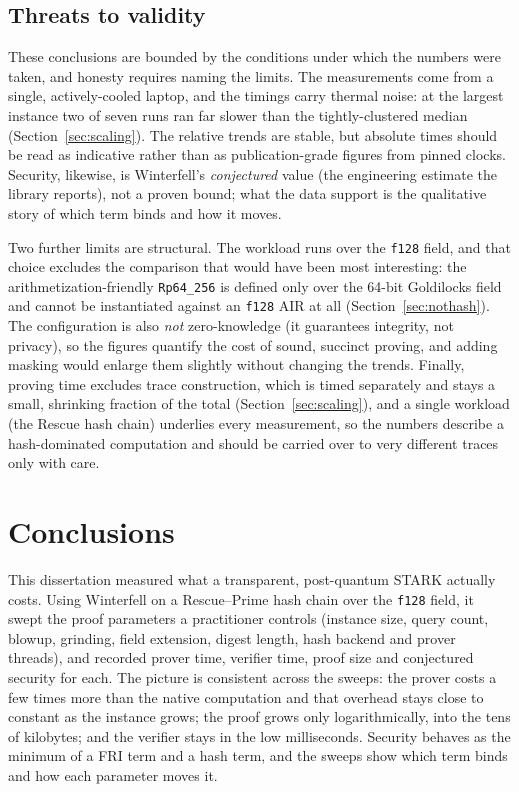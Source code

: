 \documentclass[11pt]{article}
\begin{document}
\subsection{Threats to validity}
\label{sec:disc-limits}

These conclusions are bounded by the conditions under which the numbers were taken, and honesty requires
naming the limits. The measurements come from a single, actively-cooled laptop, and the timings carry
thermal noise: at the largest instance two of seven runs ran far slower than the tightly-clustered
median (Section~\ref{sec:scaling}). The relative trends are stable, but absolute times should be read as
indicative rather than as publication-grade figures from pinned clocks. Security, likewise, is
Winterfell's \emph{conjectured} value (the engineering estimate the library reports), not a proven
bound; what the data support is the qualitative story of which term binds and how it moves.

Two further limits are structural. The workload runs over the \texttt{f128} field, and that choice
excludes the comparison that would have been most interesting: the arithmetization-friendly
\texttt{Rp64\_256} is defined only over the 64-bit Goldilocks field and cannot be instantiated against an
\texttt{f128} AIR at all (Section~\ref{sec:nothash}). The configuration is also \emph{not} zero-knowledge
(it guarantees integrity, not privacy), so the figures quantify the cost of sound, succinct proving,
and adding masking would enlarge them slightly without changing the trends. Finally, proving time
excludes trace construction, which is timed separately and stays a small, shrinking fraction of the total
(Section~\ref{sec:scaling}), and a single workload (the Rescue hash chain) underlies every
measurement, so the numbers describe a hash-dominated computation and should be carried over to very
different traces only with care.

\section{Conclusions}
\label{sec:conclusions}

This dissertation measured what a transparent, post-quantum STARK actually costs. Using Winterfell on a
Rescue--Prime hash chain over the \texttt{f128} field, it swept the proof parameters a practitioner
controls (instance size, query count, blowup, grinding, field extension, digest length, hash backend
and prover threads), and recorded prover time, verifier time, proof size and conjectured security for
each. The picture is consistent across the sweeps: the prover costs a few times more than the native
computation and that overhead stays close to constant as the instance grows; the proof grows only
logarithmically, into the tens of kilobytes; and the verifier stays in the low milliseconds. Security
behaves as the minimum of a FRI term and a hash term, and the sweeps show which term binds and how each
parameter moves it.
\end{document}
